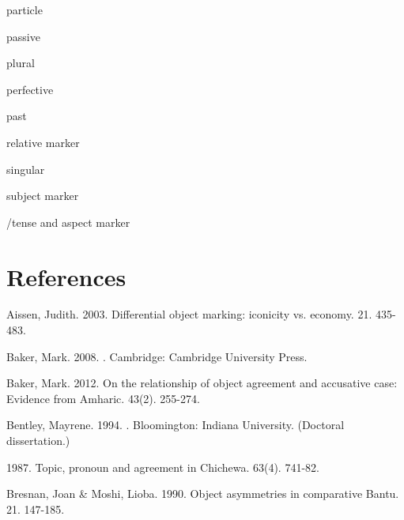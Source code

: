 \documentclass[output=paper]{langsci/langscibook}
\begin{document}
particle

passive

plural

perfective

past

  relative marker

singular

subject marker

/tense and aspect marker

\section{ References}

Aissen, Judith. 2003. Differential object marking: iconicity vs. economy.  21. 435-483.

Baker, Mark. 2008. . Cambridge: Cambridge University Press.

Baker, Mark. 2012. On the relationship of object agreement and accusative case: Evidence from Amharic.  43(2). 255-274.

Bentley, Mayrene. 1994. . Bloomington: Indiana University. (Doctoral dissertation.)


1987. Topic, pronoun and agreement in Chichewa.  63(4). 741-82.

Bresnan, Joan \& Moshi, Lioba. 1990. Object asymmetries in comparative Bantu.  21. 147-185.
\end{document}
